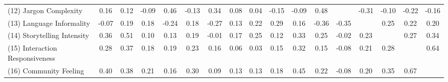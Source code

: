 \begin{landscape}
\begin{table}[!ht]
\begin{tabular}{lcccccccccccccccc}
      (12) Jargon Complexity          & 0.16  & 0.12 & -0.09 & 0.46  & -0.13 & 0.34  & 0.08  & 0.04  & -0.15 & -0.09 & 0.48  &       & -0.31 & -0.10 & -0.22 & -0.16 \\
      (13) Language Informality       & -0.07 & 0.19 & 0.18  & -0.24 & 0.18  & -0.27 & 0.13  & 0.22  & 0.29  & 0.16  & -0.36 & -0.35 &       & 0.25  & 0.22  & 0.20  \\
      (14) Storytelling Intensity     & 0.36  & 0.51 & 0.10  & 0.13  & 0.19  & -0.01 & 0.17  & 0.25  & 0.12  & 0.33  & 0.25  & -0.02 & 0.23  &       & 0.27  & 0.34  \\
      (15) Interaction Responsiveness & 0.28  & 0.37 & 0.18  & 0.19  & 0.23  & 0.16  & 0.06  & 0.03  & 0.15  & 0.32  & 0.15  & -0.08 & 0.21  & 0.28  &       & 0.64  \\
      (16) Community Feeling          & 0.40  & 0.38 & 0.21  & 0.16  & 0.30  & 0.09  & 0.13  & 0.13  & 0.18  & 0.45  & 0.22  & -0.08 & 0.20  & 0.35  & 0.67  &       \\ \bottomrule
    \end{tabular}
  \end{table}

\end{landscape}
